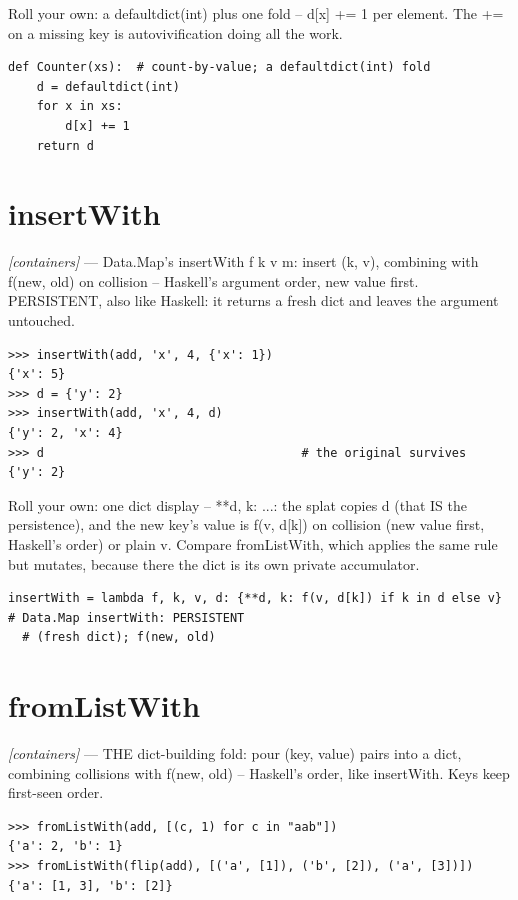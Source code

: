 \documentclass[11pt,letterpaper]{book}
\begin{document}
Roll your own: a defaultdict(int) plus one fold -- d[x] += 1 per element. The += on a missing key is autovivification doing all the work.

\begin{lstlisting}[style=code]
def Counter(xs):  # count-by-value; a defaultdict(int) fold
    d = defaultdict(int)
    for x in xs:
        d[x] += 1
    return d
\end{lstlisting}

\section{insertWith}
\noindent\textit{[containers]} --- Data.Map's insertWith f k v m: insert (k, v), combining with f(new, old) on collision -- Haskell's argument order, new value first. PERSISTENT, also like Haskell: it returns a fresh dict and leaves the argument untouched.
\begin{lstlisting}[style=spec]
>>> insertWith(add, 'x', 4, {'x': 1})
{'x': 5}
>>> d = {'y': 2}
>>> insertWith(add, 'x', 4, d)
{'y': 2, 'x': 4}
>>> d                                    # the original survives
{'y': 2}
\end{lstlisting}

Roll your own: one dict display -- {**d, k: ...}: the splat copies d (that IS the persistence), and the new key's value is f(v, d[k]) on collision (new value first, Haskell's order) or plain v. Compare fromListWith, which applies the same rule but mutates, because there the dict is its own private accumulator.

\begin{lstlisting}[style=code]
insertWith = lambda f, k, v, d: {**d, k: f(v, d[k]) if k in d else v}  # Data.Map insertWith: PERSISTENT
  # (fresh dict); f(new, old)
\end{lstlisting}

\section{fromListWith}
\noindent\textit{[containers]} --- THE dict-building fold: pour (key, value) pairs into a dict, combining collisions with f(new, old) -- Haskell's order, like insertWith. Keys keep first-seen order.
\begin{lstlisting}[style=spec]
>>> fromListWith(add, [(c, 1) for c in "aab"])
{'a': 2, 'b': 1}
>>> fromListWith(flip(add), [('a', [1]), ('b', [2]), ('a', [3])])
{'a': [1, 3], 'b': [2]}
\end{lstlisting}
\end{document}
